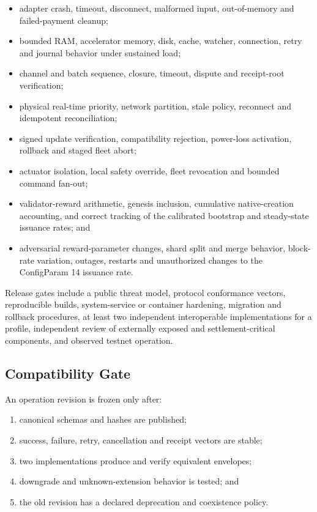 \documentclass[11pt,oneside]{article}
\begin{document}
\begin{itemize}
  \item adapter crash, timeout, disconnect, malformed input, out-of-memory and failed-payment
        cleanup;
  \item bounded RAM, accelerator memory, disk, cache, watcher, connection, retry and journal
        behavior under sustained load;
  \item channel and batch sequence, closure, timeout, dispute and receipt-root verification;
  \item physical real-time priority, network partition, stale policy, reconnect and
        idempotent reconciliation;
  \item signed update verification, compatibility rejection, power-loss activation,
        rollback and staged fleet abort;
  \item actuator isolation, local safety override, fleet revocation and bounded command
        fan-out;
  \item validator-reward arithmetic, genesis inclusion, cumulative native-creation accounting,
        and correct tracking of the calibrated bootstrap and steady-state issuance rates; and
  \item adversarial reward-parameter changes, shard split and merge behavior, block-rate
        variation, outages, restarts and unauthorized changes to the ConfigParam 14 issuance rate.
\end{itemize}

Release gates include a public threat model, protocol conformance vectors, reproducible
builds, system-service or container hardening, migration and rollback procedures, at least two
independent interoperable implementations for a profile, independent review of externally
exposed and settlement-critical components, and observed testnet operation.

\subsection{Compatibility Gate}

An operation revision is frozen only after:

\begin{enumerate}
  \item canonical schemas and hashes are published;
  \item success, failure, retry, cancellation and receipt vectors are stable;
  \item two implementations produce and verify equivalent envelopes;
  \item downgrade and unknown-extension behavior is tested; and
  \item the old revision has a declared deprecation and coexistence policy.
\end{enumerate}
\end{document}
